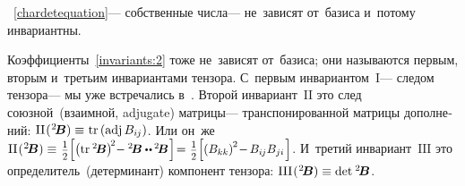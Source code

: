 \begin{otherlanguage}{russian}
 ~\eqref{chardetequation}\:--- собственные числа\:--- не~зависят от~базиса и~потому инвариантны.

Коэффициенты~\eqref{invariants:2} тоже не~зависят от~базиса; они называются первым, вторым и~третьим инвариантами тензора.
С~первым инвариантом~${\mathrm{I}}$\:--- следом тензора\:--- мы уже встречались в~.
Второй инвариант~${\mathrm{II}}$ это след союзной~(взаимной, adjugate) матрицы\:--- транспонированной матрицы дополнений: ${\mathrm{II}\hspace{.16ex}(\hspace{.1ex}{^2\!\bm{B}}) \equiv \hspace{.1ex} \operatorname{tr} \left({\operatorname{adj}{B_{i\hspace{-0.1ex}j}}}\right)}$.
Или он~же
\hbox{${\mathrm{II}\hspace{.16ex}(\hspace{.1ex}{^2\!\bm{B}}) \equiv \hspace{.2ex} \smalldisplaystyleonehalf \scalebox{0.96}[0.96]{$\left[
\left(\operatorname{tr}\hspace{.1ex} {^2\!\bm{B}}\right)^{\!2} \hspace{-0.5ex}
- {^2\!\bm{B}} \dotdotp \hspace{-0.1ex} {^2\!\bm{B}} \hspace{.16ex}
\right]$} \hspace{-0.4ex} = \hspace{.1ex} \smalldisplaystyleonehalf \scalebox{0.96}[0.96]{$\left[
\left( B_{kk} \right)^{\hspace{-0.1ex}2} \hspace{-0.4ex}
- \hspace{-0.2ex} B_{i\hspace{-0.1ex}j} B_{ji} \hspace{.2ex}
\right]$}}$\hspace{-0.25ex}}.
И~третий инвариант~${\mathrm{III}}$ это определитель~(детерминант) компонент тензора:
${\mathrm{III}\hspace{.16ex}(\hspace{.1ex}{^2\!\bm{B}}) \equiv \operatorname{det}\hspace{.1ex} {^2\!\bm{B}}}$.


\end{otherlanguage}
